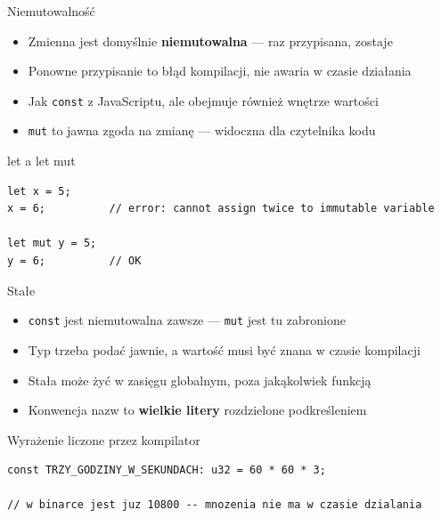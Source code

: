 \begin{frame}[fragile]{Niemutowalność}
  \begin{itemize}
    \item Zmienna jest domyślnie \textbf{niemutowalna} --- raz przypisana, zostaje
    \item Ponowne przypisanie to błąd kompilacji, nie awaria w czasie działania
    \item Jak \texttt{const} z JavaScriptu, ale obejmuje również wnętrze wartości
    \item \texttt{mut} to jawna zgoda na zmianę --- widoczna dla czytelnika kodu
  \end{itemize}
  \begin{block}{let a let mut}
\begin{lstlisting}
let x = 5;
x = 6;          // error: cannot assign twice to immutable variable

let mut y = 5;
y = 6;          // OK
\end{lstlisting}
  \end{block}
\end{frame}

\begin{frame}[fragile]{Stałe}
  \begin{itemize}
    \item \texttt{const} jest niemutowalna zawsze --- \texttt{mut} jest tu zabronione
    \item Typ trzeba podać jawnie, a wartość musi być znana w czasie kompilacji
    \item Stała może żyć w zasięgu globalnym, poza jakąkolwiek funkcją
    \item Konwencja nazw to \textbf{wielkie litery} rozdzielone podkreśleniem
  \end{itemize}
  \begin{block}{Wyrażenie liczone przez kompilator}
\begin{lstlisting}
const TRZY_GODZINY_W_SEKUNDACH: u32 = 60 * 60 * 3;

// w binarce jest juz 10800 -- mnozenia nie ma w czasie dzialania
\end{lstlisting}
  \end{block}
\end{frame}


